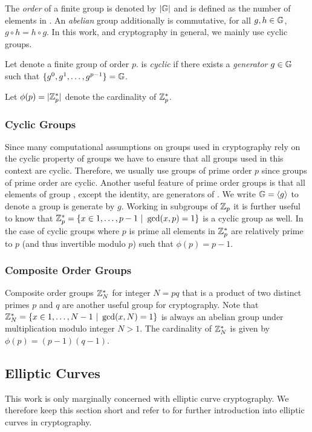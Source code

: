 \noindent
The \emph{order} of a finite group \GG is denoted by $|\mathbb{G}|$ and is defined as the number of elements in \GG.
An \emph{abelian} group additionally is commutative, \ie for all $g,h\in\mathbb{G}$, $g\circ h=h\circ g$.
In this work, and cryptography in general, we mainly use cyclic groups.

\begin{definition}\label{def:cyclicgroups}
Let \GG denote a finite group of order $p$.
\GG is \emph{cyclic} if there exists a \emph{generator} $g\in\mathbb{G}$ such that $\{g^0,g^1,\dots,g^{p-1}\}=\mathbb{G}$.
\eod
\end{definition}

\noindent
Let $\phi(p)=|\mathbb{Z}^\ast_p|$ denote the cardinality of $\mathbb{Z}^\ast_p$.

\subsubsection{Cyclic Groups}
Since many computational assumptions on groups used in cryptography rely on the cyclic property of groups we have to ensure that all groups used in this context are cyclic.
Therefore, we usually use groups of prime order $p$ since groups of prime order are cyclic.
Another useful feature of prime order groups is that all elements of group \GG, except the identity, are generators of \GG.
We write $\mathbb{G}=\langle g_{} \rangle$ to denote a group \GG is generate by $g$.
Working in subgroups of $\mathbb{Z}_p$ it is further useful to know that $\mathbb{Z}^\ast_p=\{x\in{1,\dots,p-1}~|~\gcd(x,p)=1\}$ is a cyclic group as well.
In the case of cyclic groups where $p$ is prime all elements in $\mathbb{Z}^\ast_p$ are relatively prime to $p$ (and thus invertible modulo $p$) such that $\phi(p)=p-1$.

\subsubsection{Composite Order Groups}
Composite order groups $\mathbb{Z}^\ast_N$ for integer $N=pq$ that is a product of two distinct primes $p$ and $q$ are another useful group for cryptography.
Note that $\mathbb{Z}^\ast_N=\{x\in{1,\dots,N-1}~|~\gcd(x,N)=1\}$ is always an abelian group under multiplication modulo integer $N>1$.
The cardinality of $\mathbb{Z}^\ast_N$ is given by $\phi(p)=(p-1)(q-1)$.


\subsection{Elliptic Curves}
This work is only marginally concerned with elliptic curve cryptography.
We therefore keep this section short and refer to \cite{HankersonMS03} for further introduction into elliptic curves in cryptography.

